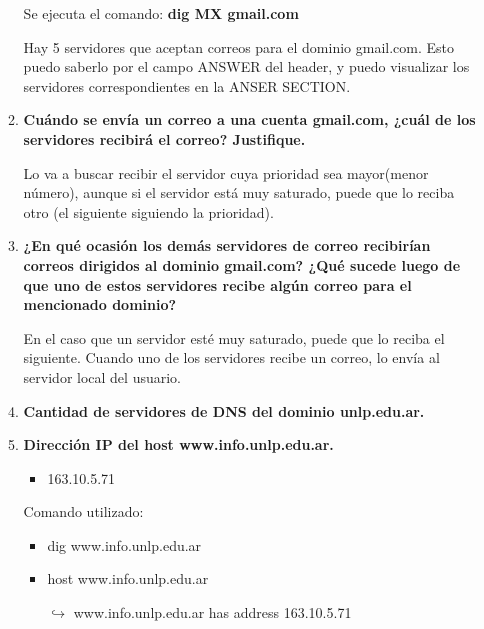 \documentclass[a4paper,10pt]{article}
\begin{document}
\begin{enumerate}
\begin{enumerate}
                Se ejecuta el comando:
                \subitem \textbf{dig MX gmail.com}
                
                Hay 5 servidores que aceptan correos para el dominio gmail.com. Esto puedo saberlo por el campo ANSWER del header, y puedo visualizar los servidores correspondientes en la ANSER SECTION.
                
                \item \textbf{Cuándo se envía un correo a una cuenta gmail.com, ¿cuál de los servidores recibirá el correo? Justifique.}
                
                Lo va a buscar recibir el servidor cuya prioridad sea mayor(menor número), aunque si el servidor está muy saturado, puede que lo reciba otro (el siguiente siguiendo la prioridad).
                
                \item \textbf{ ¿En qué ocasión los demás servidores de correo recibirían correos dirigidos al dominio gmail.com? ¿Qué sucede luego de que uno de estos servidores recibe algún correo para el mencionado dominio?}
                
                En el caso que un servidor esté muy saturado, puede que lo reciba el siguiente. Cuando uno de los servidores recibe un correo, lo envía al servidor local del usuario.
                
                \item \textbf{Cantidad de servidores de DNS del dominio unlp.edu.ar.}
                
                
                \item \textbf{Dirección IP del host www.info.unlp.edu.ar.}
                    \begin{itemize}
                        \item 163.10.5.71
                    \end{itemize} 
                Comando utilizado:
                    \begin{itemize}
                        \item dig www.info.unlp.edu.ar
                        \item host www.info.unlp.edu.ar
                        
                        $\hookrightarrow{}$ www.info.unlp.edu.ar has address 163.10.5.71 
                    \end{itemize}                
            \end{enumerate}
            

\end{enumerate}
\end{document}
